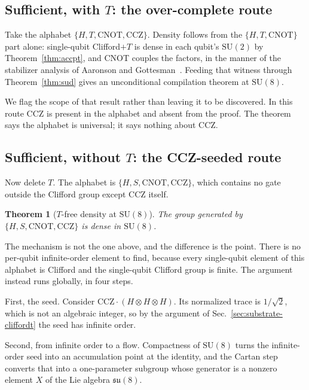 \documentclass[aps,pra,reprint,nofootinbib,superscriptaddress]{revtex4-2}
\newcommand{\su}[1]{\mathrm{SU}(#1)}
\theoremstyle{plain}
\newtheorem{theorem}{Theorem}
\theoremstyle{definition}
\begin{document}
\subsection{Sufficient, with \texorpdfstring{$T$}{T}: the over-complete route}

Take the alphabet $\{H, T, \mathrm{CNOT}, \mathrm{CCZ}\}$. Density follows from
the $\{H, T, \mathrm{CNOT}\}$ part alone: single-qubit Clifford$+T$ is dense in
each qubit's $\su 2$ by Theorem~\ref{thm:accpt}, and CNOT couples the factors,
in the manner of the stabilizer analysis of Aaronson and
Gottesman~\cite{AaronsonGottesman2004}. Feeding that witness through
Theorem~\ref{thm:sud} gives an unconditional compilation theorem at $\su 8$.

We flag the scope of that result rather than leaving it to be discovered. In
this route CCZ is present in the alphabet and absent from the proof. The
theorem says the alphabet is universal; it says nothing about CCZ.

\subsection{Sufficient, without \texorpdfstring{$T$}{T}: the CCZ-seeded route}

Now delete $T$. The alphabet is $\{H, S, \mathrm{CNOT}, \mathrm{CCZ}\}$, which
contains no gate outside the Clifford group except CCZ itself.

\begin{theorem}[$T$-free density at $\su 8$]
\label{thm:literal}
The group generated by $\{H, S, \mathrm{CNOT}, \mathrm{CCZ}\}$ is dense in
$\su 8$.
\end{theorem}

The mechanism is not the one above, and the difference is the point. There is
no per-qubit infinite-order element to find, because every single-qubit element
of this alphabet is Clifford and the single-qubit Clifford group is finite. The
argument instead runs globally, in four steps.

First, the seed. Consider $\mathrm{CCZ}\cdot(H\otimes H\otimes H)$. Its
normalized trace is $1/\sqrt 2$, which is not an algebraic integer, so by the
argument of Sec.~\ref{sec:substrate-cliffordt} the seed has infinite order.

Second, from infinite order to a flow. Compactness of $\su 8$ turns the
infinite-order seed into an accumulation point at the identity, and the Cartan
step converts that into a one-parameter subgroup whose generator is a nonzero
element $X$ of the Lie algebra $\mathfrak{su}(8)$.
\end{document}
